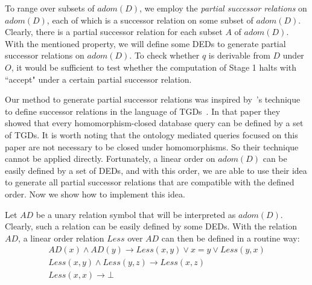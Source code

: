 \documentclass[letterpaper]{article} %
\theoremstyle{definition}
\theoremstyle{remark}
\theoremstyle{definition}
\begin{document}
To range over subsets of $adom(D)$, we employ the {\em partial successor relations} on $adom(D)$, each of which is a successor relation on some subset of $adom(D)$. Clearly, there is a partial successor relation for each subset $A$ of $adom(D)$. With the mentioned property, we will define some DEDs to generate partial successor relations on $adom(D)$. To check whether $q$ is derivable from $D$ under $O$, it would be sufficient to test whether the computation of Stage 1 halts with ``accept" under a certain partial successor relation.

Our method to generate partial successor relations was inspired by~\citeauthor{RudolphT2015}'s technique to define successor relations in the language of TGDs~. In that paper they showed that every homomorphism-closed database query can be defined by a set of TGDs. It is worth noting that the ontology mediated queries focused on this paper are not necessary to be closed under homomorphisms. So their technique cannot be applied directly. 
%
%
Fortunately, a linear order on $adom(D)$ can be easily defined by a set of DEDs, and with this order, we are able to use their idea to generate all partial successor relations that are compatible with the defined order. Now we show how to implement this idea.

Let $\textit{AD}$ be a unary relation symbol that will be interpreted as $adom(D)$. Clearly, such a relation can be easily defined by some DEDs.
With the relation $\textit{AD}$, a linear order relation $\textit{Less}$ over $\textit{AD}$ can then be defined in a routine way: 
\begin{eqnarray}
\label{eq:succ_guess} \textit{AD}(x)\wedge\textit{AD}(y)\rightarrow\textit{Less}(x,y)\vee x=y\vee\textit{Less}(y,x)\\
\textit{Less}(x,y)\wedge\textit{Less}(y,z)\rightarrow\textit{Less}(x,z)\\
\label{eq:succ_undesired}\textit{Less}(x,x)\rightarrow\bot
\end{eqnarray}
\end{document}
